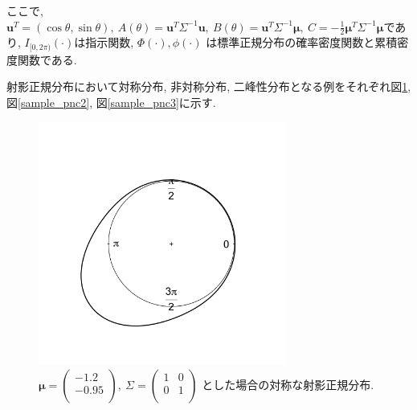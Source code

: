\documentclass[a4j,12pt]{jarticle}
\begin{document}
\noindent
ここで, $\bm u^T = (\cos\theta,\sin\theta), \ A(\theta) = \bm u^T\Sigma^{-1}\bm u, \ B(\theta) = \bm u^T \Sigma^{-1} \bm \mu, \ C = -\frac{1}{2} \bm \mu^T \Sigma^{-1} \bm \mu$であり, $I_{[0,2\pi)} (\cdot)$は指示関数, $\Phi(\cdot), \phi(\cdot)$ は標準正規分布の確率密度関数と累積密度関数である.

射影正規分布において対称分布, 非対称分布, 二峰性分布となる例をそれぞれ図\ref{sample_pnc1}, 図\ref{sample_pnc2}, 図\ref{sample_pnc3}に示す. 

\begin{figure}[bp]
\begin{center}
\includegraphics[clip,height= 80mm]{data/sample_symmetry.png}
\caption[対称な射影正規分布]{
$\bm \mu = \begin{pmatrix} -1.2 \\ -0.95 \\ \end{pmatrix}, \ \Sigma = \begin{pmatrix}  1 & 0 \\ 0 & 1 \\ \end{pmatrix}$
とした場合の対称な射影正規分布.}
\label{sample_pnc1}
\end{center}
\end{figure}
\end{document}
